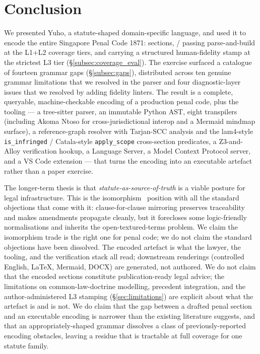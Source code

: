 \section{Conclusion}
\label{sec:conclusion}

We presented Yuho, a statute-shaped domain-specific language, and used
it to encode the entire Singapore Penal Code 1871: \statRawSections{}
sections, \statLOnePass{}/\statRawSections{} passing parse-and-build at
the L1+L2 coverage tiers, and \statLThreePass{} carrying a structured
human-fidelity stamp at the strictest L3 tier (\S\ref{subsec:coverage_eval}).
The exercise surfaced a catalogue of fourteen grammar gaps
(\S\ref{subsec:gaps}), distributed across ten genuine grammar
limitations that we resolved in the parser and four diagnostic-layer
issues that we resolved by adding fidelity linters. The result is a
complete, queryable, machine-checkable encoding of a production penal
code, plus the tooling --- a tree-sitter parser, an immutable Python
AST, eight transpilers (including Akoma Ntoso for cross-jurisdictional
interop and a Mermaid mindmap surface), a reference-graph resolver with Tarjan-SCC analysis and the
lam4-style \texttt{is\_infringed} / Catala-style \texttt{apply\_scope}
cross-section predicates, a Z3-and-Alloy verification hookup, a Language
Server, a Model Context Protocol server, and a VS Code extension ---
that turns the encoding into an executable artefact rather than a
paper exercise.

The longer-term thesis is that \emph{statute-as-source-of-truth} is a
viable posture for legal infrastructure. This is the
isomorphism~\cite{benchcapon1992isomorphism} position with all the
standard objections that come with it: clause-for-clause mirroring
preserves traceability and makes amendments propagate cleanly, but
it forecloses some logic-friendly normalisations and inherits the
open-textured-terms problem. We claim the isomorphism trade is the
right one for penal code; we do not claim the standard objections
have been dissolved. The encoded artefact is what
the lawyer, the tooling, and the verification stack all read;
downstream renderings (controlled English, \LaTeX{}, Mermaid, DOCX)
are generated, not authored. We do not claim that the \statRawSections{}
encoded sections constitute publication-ready legal advice; the
limitations on common-law-doctrine modelling, precedent integration,
and the author-administered L3 stamping (\S\ref{sec:limitations})
are explicit about what the artefact is and is not. We do claim that the gap
between a drafted penal section and an executable encoding is
narrower than the existing literature suggests, and that an
appropriately-shaped grammar dissolves a class of previously-reported
encoding obstacles, leaving a residue that is tractable at full
coverage for one statute family.

